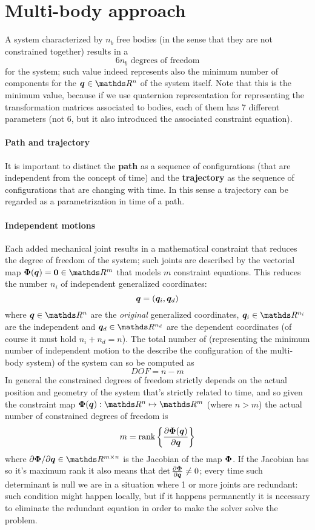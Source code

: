 \section{Multi-body approach}
	A system characterized by $n_b$ free bodies (in the sense that they are not constrained together) results in a 
	\[ 6 n_b \textrm{ degrees of freedom} \]
	for the system; such value indeed represents also the minimum number of components for the  $\vett q \in \mathds R^n$ of the system itself. Note that this is the minimum value, because if we use quaternion representation for representing the transformation matrices associated to bodies, each of them has 7 different parameters (not 6, but it also introduced the associated constraint equation).
	
	\paragraph{Path and trajectory} It is important to distinct the \textbf{path} as a sequence of configurations (that are independent from the concept of time) and the \textbf{trajectory} as the sequence of configurations that are changing with time. In this sense a trajectory can be regarded as a parametrization in time of a path.
	
	\paragraph{Independent motions} Each added mechanical joint results in a mathematical constraint that reduces the degree of freedom of the system; such joints are described by the vectorial map $\vett \Phi(\vett q) = \vett 0 \in \mathds R^m$ that models $m$ constraint equations. This reduces the number $n_i$ of independent generalized coordinates:
	\[ \boldsymbol{q} = (\boldsymbol{q}_i, \boldsymbol{q}_d) \]
	where $\vett q \in \mathds R^n$ are the \textit{original} generalized coordinates, $\vett q_i \in \mathds R^{n_i}$ are the independent and $\vett q_d\in \mathds R^{n_d}$ are the dependent coordinates (of course it must hold $n_i + n_d = n$). The total number of  (representing the minimum number of independent motion to the describe the configuration of the multi-body system) of the system can so be computed as
	\[ DOF = n - m \]
	In general the constrained degrees of freedom strictly depends on the actual position and geometry of the system that's strictly related to time, and so given the constraint map $\vett \Phi(\vett q) : \mathds R^n \mapsto \mathds R^m$ (where $n>m$) the actual number of constrained degrees of freedom is
	\begin{equation}
		m = \textrm{rank}\left\{\frac{\partial \boldsymbol{\Phi}(\boldsymbol{q})}{\partial \boldsymbol{q}} \right\}
	\end{equation}
	where $\partial \vett \Phi / \partial \vett q \in \mathds R^{m\times n}$ is the Jacobian of the map $\boldsymbol{\Phi}$. If the Jacobian has so it's maximum rank it also means that $\det \frac{\partial \boldsymbol{\Phi}}{\partial \boldsymbol{q}} \neq 0$; every time such determinant is null we are in a situation where 1 or more joints are redundant: such condition might happen locally, but if it happens permanently it is necessary to eliminate the redundant equation in order to make the solver solve the problem.
	
